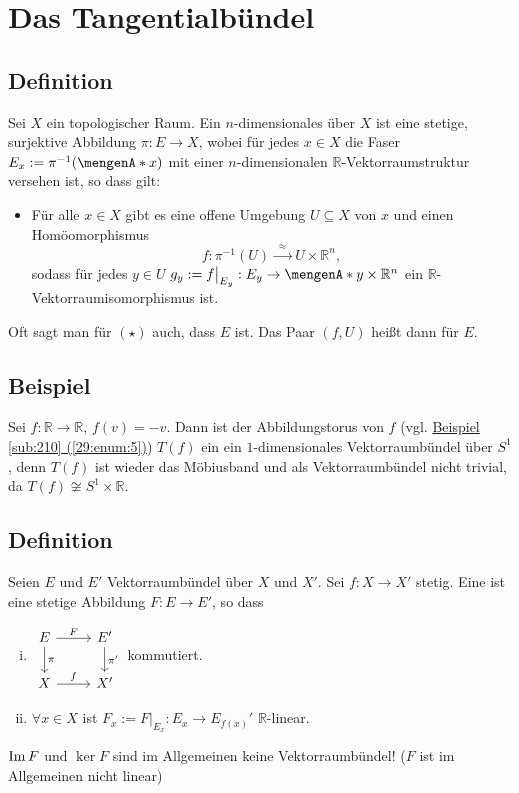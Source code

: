\section{Das Tangentialbündel} %
\label{sec:19}

\subsection[Definition: Vektorraumbündel]{Definition} %
\label{sub:191}
Sei $X$ ein topologischer Raum. Ein $n$-dimensionales  über $X$ ist eine stetige, surjektive Abbildung $\pi  : E \to X$, wobei für jedes 
$x \in X$ die Faser $E_x := \pi ^{-1} (\set{x})$ mit einer $n$-dimensionalen $\mathds{R}$-Vektorraumstruktur versehen ist, so dass gilt: 
\begin{itemize}[$(\star)$]
	\item Für alle $x \in X$ gibt es eine offene Umgebung $U \subseteq X$ von $x$ und einen Homöomorphismus 
	\[
		f : \pi ^{-1}(U) \xrightarrow{\enspace\approx \enspace} U \times \mathds{R}^n, 
	\]
	sodass für jedes $y \in U$ $g_y := f \big|_{E_y} : E_y  \to \set{y} \times \mathds{R}^n $ ein $\mathds{R}$-Vektorraumisomorphismus ist.
\end{itemize}
Oft sagt man für $(\star)$ auch, dass $E$  ist. Das Paar $(f,U)$ heißt dann  für $E$.  

\subsection[Beispiel: Das Möbiusband ist ein nichttriviales Vektorraumbündel]{Beispiel} %
\label{sub:192}
Sei $f : \mathds{R} \to \mathds{R}$, $f(v)=-v$. Dann ist der Abbildungstorus von $f$ (vgl. \hyperref[29:enum:5]{Beispiel \ref*{sub:210} (\ref*{29:enum:5})}) $T(f)$ ein ein $1$-dimensionales Vektorraumbündel über $S^1$, denn
$T(f)$ ist wieder das Möbiusband und als Vektorraumbündel nicht trivial, da $T(f) \not\cong S^1 \times \mathds{R}$.

\subsection[Definition: Lineare Abbildung über $f$]{Definition} %
\label{sub:193}
Seien $E$ und $E'$ Vektorraumbündel über $X$ und $X'$. Sei $f : X \to X'$ stetig. Eine  ist eine stetige Abbildung $F : E \to E'$,
so dass 
\begin{enumerate}[(i)]
	\item \(
		\begin{tikzcd}
			E \rar["F"] \dar["\pi"] & E'  \dar["\pi'"]\\
			X \rar["f"] & X'
		\end{tikzcd}
	\)
	kommutiert.
	\item $\forall x \in X$ ist $F_x := F \big|_{E_x} : E_x \to E_{f(x)}'$ $\mathds{R}$-linear.
\end{enumerate}
$\operatorname{Im} F$ und $\ker F$ sind im Allgemeinen keine Vektorraumbündel! ($F$ ist im Allgemeinen nicht linear)

